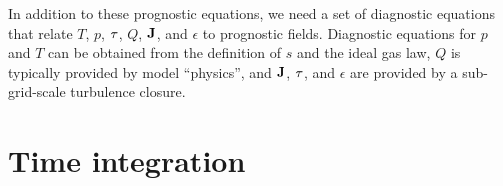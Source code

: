 \documentclass[11pt]{article}
\begin{document}
In addition to these prognostic equations, we need a set of diagnostic equations that relate $T$, $p$, ${\bf \tau}$, $Q$, ${\bf J}$, and $\epsilon$ to prognostic fields. Diagnostic equations for $p$ and $T$ can be obtained from the definition of $s$ and the ideal gas law, $Q$ is typically provided by model ``physics'', and ${\bf J}$, ${\bf \tau}$, and $\epsilon$ are provided by a sub-grid-scale turbulence closure.

\section{Time integration}
\end{document}
